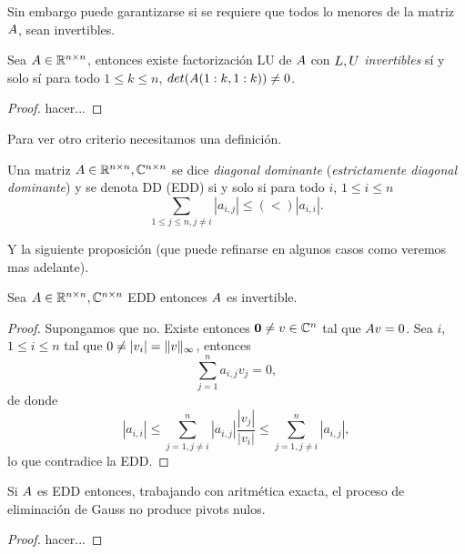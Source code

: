 \begin{tcolorbox}
Sin embargo puede garantizarse si se requiere que todos lo menores de la matriz $\Ab$,
sean invertibles.

\begin{tcolorbox}
[colback=black!15!white,colframe=black!75!black]
\begin{prop}\label{prop:menorenonulos}
 Sea $\Ab\in \Rnn$, entonces existe factorización LU de $\Ab$ con $\Lb,\Ub$ \emph{invertibles} sí y solo sí
 para todo  $1\le k\le n$,  $det(\Ab(1:k,1:k))\neq 0$.
\end{prop}

\end{tcolorbox}
 \begin{proof}
  hacer...
 \end{proof}

Para ver otro criterio necesitamos una definición.
\tccdefi
\begin{defi}
  \label{defi:deDD}
  Una matriz $\Ab\in \Rnn, \Cnn$ se dice \emph{diagonal dominante} (\emph{estrictamente diagonal dominante}) y se denota DD (EDD) si y solo si para todo $i$,
 $1\le i\le n$
 $$
 \sum_{1\le j \le n, j\neq i}|a_{i,j}|\le (<) |a_{i,i}|.
 $$

 \end{defi}
\end{tcolorbox}
Y la siguiente proposición (que puede refinarse en algunos casos como veremos mas adelante).
\tcc
\begin{prop}
 Sea $\Ab\in \Rnn, \Cnn$ EDD entonces $\Ab$ es invertible.
\end{prop}
\etcc
\begin{proof}
 Supongamos que no. Existe entonces
 ${\bf 0}\neq \vb\in\Cn$ tal que
 $\Ab\vb=\cero$. Sea $i$, $1\le i\le n$ tal que $0\neq |v_i|=\|\vb\|_\infty$, entonces
 $$
 \sum_{j=1}^na_{i,j}v_j=0,
 $$
 de donde
 $$
 |a_{i,i}|\le \sum_{j=1, j\neq i}^n|a_{i,j}|\frac{|v_j|}{|v_i|}\le
 \sum_{j=1, j\neq i}^n|a_{i,j}|,
 $$
 lo que contradice la EDD.
\end{proof}






\begin{tcolorbox}
[colback=black!15!white,colframe=black!75!black] \begin{prop}
  Si $\Ab$ es EDD entonces, trabajando con aritmética exacta, el proceso de eliminación de Gauss no produce pivots nulos.
 \end{prop}
\end{tcolorbox}
\begin{proof}
 hacer...
\end{proof}

